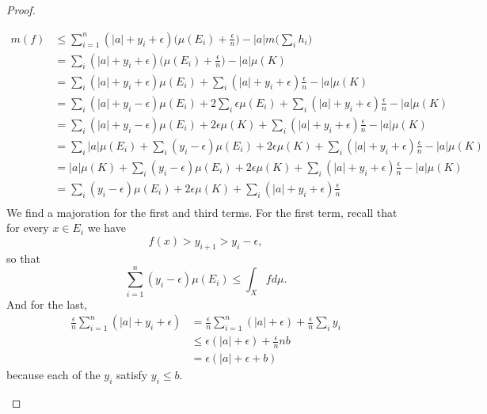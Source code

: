 \begin{proof}
\begin{subproof}
\begin{subequations}
                \begin{align}
                    m(f)&\leq \sum_{i=1}^n(| a |+y_i+\epsilon)\big( \mu(E_i)+\frac{ \epsilon }{ n } \big)-| a |m\big( \sum_i h_i \big)\\
                    &= \sum_i(| a |+y_i+\epsilon)\big( \mu(E_i)+\frac{ \epsilon }{ n } \big)-| a |\mu(K)\\
                    &=\sum_i(| a |+y_i+\epsilon)\mu(E_i)+\sum_i(| a |+y_i+\epsilon)\frac{ \epsilon }{ n }-| a |\mu(K)\\
                    &=\sum_i(| a |+y_i-\epsilon)\mu(E_i)+2\sum_i\epsilon\mu(E_i)+\sum_i(| a |+y_i+\epsilon)\frac{ \epsilon }{ n }-| a |\mu(K)\\
                    &=\sum_i(| a |+y_i-\epsilon)\mu(E_i)+2\epsilon\mu(K)+\sum_i(| a |+y_i+\epsilon)\frac{ \epsilon }{ n }-| a |\mu(K)\\
                    &=\sum_i| a |\mu(E_i)+\sum_i(y_i-\epsilon)\mu(E_i)+2\epsilon\mu(K)+\sum_i(| a |+y_i+\epsilon)\frac{ \epsilon }{ n }-| a |\mu(K)\\
                    &=| a |\mu(K)+\sum_i(y_i-\epsilon)\mu(E_i)+2\epsilon\mu(K)+\sum_i(| a |+y_i+\epsilon)\frac{ \epsilon }{ n }-| a |\mu(K)\\
                    &=\sum_i(y_i-\epsilon)\mu(E_i)+2\epsilon\mu(K)+\sum_i(| a |+y_i+\epsilon)\frac{ \epsilon }{ n }\\
                \end{align}
            \end{subequations}
            We find a majoration for the first and third terms. For the first term, recall that for every \( x\in E_i\) we have
            \begin{equation}
                f(x)>y_{i+1}>y_i-\epsilon,
            \end{equation}
            so that
            \begin{equation}
                \sum_{i=1}^n(y_i-\epsilon)\mu(E_i)\leq \int_Xfd\mu.
            \end{equation}
            And for the last,
            \begin{subequations}
                \begin{align}
                    \frac{ \epsilon }{ n }\sum_{i=1}^n(| a |+y_i+\epsilon)&=\frac{ \epsilon }{ n }\sum_{i=1}^n(| a |+\epsilon)+\frac{ \epsilon }{ n }\sum_iy_i\\
                    &\leq \epsilon(| a |+\epsilon)+\frac{ \epsilon }{ n }nb\\
                    &=\epsilon(| a |+\epsilon+b)
                \end{align}
            \end{subequations}
            because each of the \( y_i\) satisfy \( y_i\leq b\).


\end{subproof}
\end{proof}

